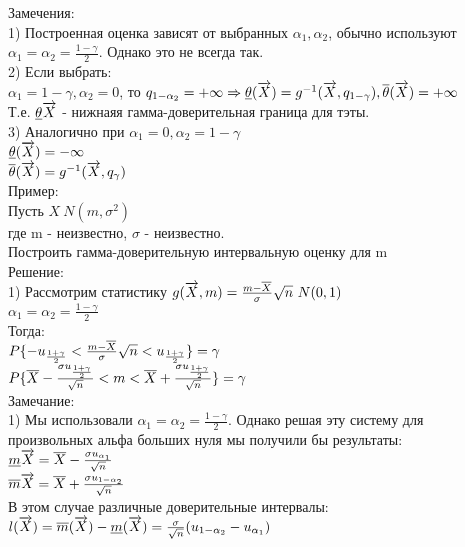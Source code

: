Замечения:\\
1) Построенная оценка зависят от  выбранных $\alpha_1, \alpha_2$, обычно используют $\alpha_1 = \alpha_2 = \frac{1 - \gamma}{2}$. Однако это не всегда так.\\
2) Если выбрать:\\
$\alpha_1 = 1 - \gamma, \alpha_2 = 0$, то $q_{1 - \alpha_{2}} = +\infty \Rightarrow \underline{\theta}(\overrightarrow{X}) = g^{-1}(\overrightarrow{X}, q_{1 - \gamma}), \overline{\theta} (\overrightarrow{X}) = +\infty$\\
Т.е. $\underline{\theta} \overrightarrow{X}$ - нижнаяя гамма-доверительная граница для тэты.\\
3) Аналогично при $\alpha_1 = 0, \alpha_2 = 1 - \gamma$\\
$\underline{\theta} (\overrightarrow{X}) = -\infty$\\
$\overline{\theta} (\overrightarrow{X}) = g^{-1} (\overrightarrow{X}, q_\gamma)$\\

Пример:\\
Пусть $X ~ N(m, \sigma^2)$\\
где m - неизвестно, $\sigma$ - неизвестно.\\
Построить гамма-доверительную интервальную оценку для m\\
Решение:\\
1) Рассмотрим статистику $g(\overrightarrow{X}, m) = \frac{m - \overline{X}}{\sigma}\sqrt{n} ~ N(0, 1)$\\
$\alpha_1 = \alpha_2 = \frac{1 - \gamma}{2}$\\
Тогда:\\
$P\{-u_{\frac{1 + \gamma}{2}} < \frac{m - \overline{X}}{\sigma}\sqrt{n} < u_{\frac{1 + \gamma}{2}}\} = \gamma$\\
$P\{\overline{X} - \frac{\sigma u_{\frac{1 + \gamma}{2}}}{\sqrt{n}} < m < \overline{X} + \frac{\sigma u_{\frac{1 + \gamma}{2}}}{\sqrt{n}}\} = \gamma$\\

Замечание:\\
1) Мы использовали $\alpha_1 = \alpha_2 = \frac{1 - \gamma}{2}$. Однако решая эту систему для произвольных альфа больших нуля мы получили бы результаты:\\
$\underline{m}\overrightarrow{X} = \overline{X} - \frac{\sigma u_{\alpha_1}}{\sqrt{n}}$\\
$\overline{m}\overrightarrow{X} = \overline{X} + \frac{\sigma u_{1 - \alpha_2}}{\sqrt{n}}$\\

В этом случае различные доверительные интервалы:\\
$l(\overrightarrow{X}) = \overline{m}(\overrightarrow{X}) - \underline{m}(\overrightarrow{X}) = \frac{\sigma}{\sqrt{n}}(u_{1 - \alpha_2} - u_{\alpha_1})$\\

